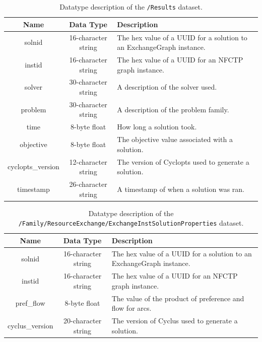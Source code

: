 \begin{table}[h!]
\centering
\caption{
\label{tbl:/Results}
Datatype description of the \lstinline[basicstyle=\ttfamily\color{black}]|/Results| dataset.}
\begin{tabularx}{\columnwidth-10pt}{|c|c|X|} %
\hline
\textbf{Name} & \textbf{Data Type} & \textbf{Description}       \\ \hline
solnid & 16-character string & The hex value of a UUID for a solution to an ExchangeGraph instance. \\ \hline
instid & 16-character string & The hex value of a UUID for an NFCTP graph instance. \\ \hline
solver & 30-character string & A description of the solver used. \\ \hline
problem & 30-character string & A description of the problem family. \\ \hline
time & 8-byte float & How long a solution took. \\ \hline
objective & 8-byte float & The objective value associated with a solution. \\ \hline
cyclopts\_version & 12-character string & The version of Cyclopts used to generate a solution. \\ \hline
timestamp & 26-character string & A timestamp of when a solution was ran. \\ \hline
\end{tabularx}
\end{table}

\begin{table}[h!]
\centering
\label{tbl:/Family/ResourceExchange/ExchangeInstSolutionProperties}
\caption{Datatype description of the \lstinline[basicstyle=\ttfamily\color{black}]|/Family/ResourceExchange/ExchangeInstSolutionProperties| dataset.}
\begin{tabularx}{\columnwidth-10pt}{|c|c|X|} %
\hline
\textbf{Name} & \textbf{Data Type} & \textbf{Description}       \\ \hline
solnid & 16-character string & The hex value of a UUID for a solution to an ExchangeGraph instance. \\ \hline
instid & 16-character string & The hex value of a UUID for an NFCTP graph instance. \\ \hline
pref\_flow & 8-byte float & The value of the product of preference and flow for arcs. \\ \hline
cyclus\_version & 20-character string & The version of Cyclus used to generate a solution. \\ \hline
\end{tabularx}
\end{table}

